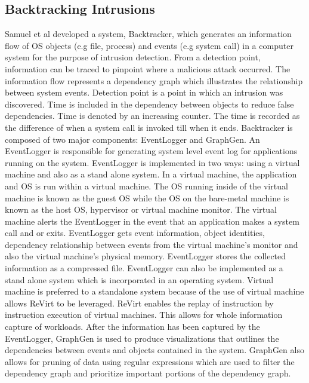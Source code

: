 \subsection{Backtracking Intrusions}
Samuel et al \cite{King:2003:BI:945445.945467} developed a system, Backtracker, which generates an information flow of OS objects (e.g file, process) and events (e.g system call) in a computer system for the purpose of intrusion detection. From a detection point, information can be traced to pinpoint where a malicious attack occurred. The information flow represents a dependency graph which illustrates the relationship between system events. Detection point is a point in which an intrusion was discovered. Time is included in the dependency between objects to reduce false dependencies. Time is denoted by an increasing counter. The time is recorded as the difference of when a system call is invoked till when it ends. Backtracker is composed of two major components: EventLogger and GraphGen. An EventLogger is responsible for generating system level event log for applications running on the system. EventLogger is implemented in two ways: using a virtual machine and also as a stand alone system. In a virtual machine, the application and OS is run within a virtual machine. The OS running inside of the virtual machine is known as the guest OS while the OS on the bare-metal machine is known as the host OS, hypervisor or virtual machine monitor. The virtual machine alerts the EventLogger in the event that an application makes a system call and or exits. EventLogger gets event information, object identities, dependency relationship between events from the virtual machine's monitor and also the virtual machine's physical memory. EventLogger stores the collected information as a compressed file. EventLogger can also be implemented as a stand alone system which is incorporated in an operating system. Virtual machine is preferred to a standalone system because of the use of virtual machine allows ReVirt to be leveraged. ReVirt enables the replay of instruction by instruction execution of virtual machines. This allows for whole information capture of workloads. After the information has been captured by the EventLogger, GraphGen is used to produce visualizations that outlines the dependencies between events and objects contained in the system. GraphGen also allows for pruning of data using regular expressions which are used to filter the dependency graph and prioritize important portions of the dependency graph.



